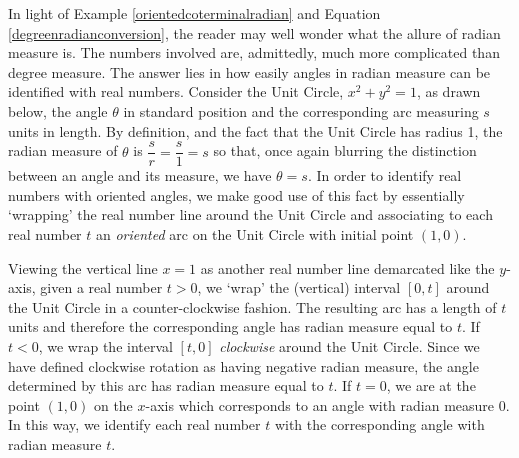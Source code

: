 \documentclass[12pt]{ximera}
\begin{document}
\medskip

In light of Example \ref{orientedcoterminalradian} and Equation \ref{degreenradianconversion}, the reader may well wonder what the allure of radian measure is.  The numbers involved are, admittedly, much more complicated than degree measure.  The answer lies in how easily angles in radian measure can be identified with real numbers.   Consider the Unit Circle, $x^2 + y^2 = 1$, as drawn below, the angle $\theta$ in standard position and the corresponding arc measuring $s$ units in length.  By definition, and the fact that the Unit Circle has radius 1, the radian measure of $\theta$ is $\dfrac{s}{r}=\dfrac{s}{1} = s$ so that, once again blurring the distinction between an angle and its measure, we have $\theta = s$.  In order to identify real numbers with oriented angles, we make good use of this fact by essentially  `wrapping'  the real number line around the Unit Circle and associating to each real number $t$ an \textit{oriented} arc  on the Unit Circle with initial point $(1,0)$.  

Viewing the vertical line $x=1$ as another real number line demarcated like the $y$-axis, given a real number $t>0$, we `wrap' the (vertical) interval $[0,t]$ around the Unit Circle in a counter-clockwise fashion.  The resulting arc has a length of $t$ units and therefore the corresponding angle has radian measure equal to $t$.  If $t<0$, we wrap the interval $[t,0]$ \textit{clockwise} around the Unit Circle.  Since we have defined clockwise rotation as having negative radian measure, the angle determined by this arc has radian measure equal to $t$.    If $t=0$, we are at the point $(1,0)$ on the $x$-axis which corresponds to an angle with radian measure $0$.  In this way, we identify each real number $t$ with the corresponding angle with radian measure $t$.

\label{wrappingfunction}

\smallskip
\end{document}
